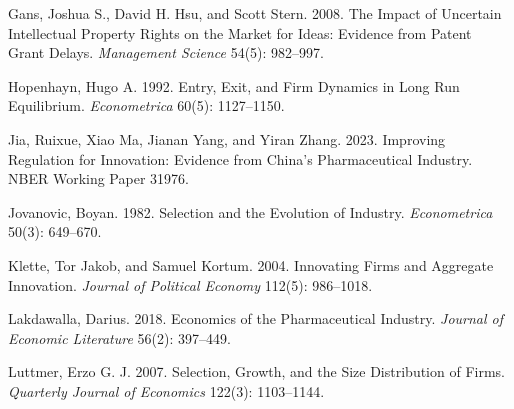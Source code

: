 \documentclass[12pt]{article}
\newcommand{\1}{\mathbf{1}}
\begin{document}
\begin{thebibliography}{}
Gans, Joshua S., David H. Hsu, and Scott Stern. 2008.
\newblock The Impact of Uncertain Intellectual Property Rights on the Market for Ideas: Evidence from Patent Grant Delays.
\newblock \emph{Management Science} 54(5): 982--997.

Hopenhayn, Hugo A. 1992.
\newblock Entry, Exit, and Firm Dynamics in Long Run Equilibrium.
\newblock \emph{Econometrica} 60(5): 1127--1150.

Jia, Ruixue, Xiao Ma, Jianan Yang, and Yiran Zhang. 2023.
\newblock Improving Regulation for Innovation: Evidence from China's Pharmaceutical Industry.
\newblock NBER Working Paper 31976.

Jovanovic, Boyan. 1982.
\newblock Selection and the Evolution of Industry.
\newblock \emph{Econometrica} 50(3): 649--670.

Klette, Tor Jakob, and Samuel Kortum. 2004.
\newblock Innovating Firms and Aggregate Innovation.
\newblock \emph{Journal of Political Economy} 112(5): 986--1018.

Lakdawalla, Darius. 2018.
\newblock Economics of the Pharmaceutical Industry.
\newblock \emph{Journal of Economic Literature} 56(2): 397--449.

Luttmer, Erzo G. J. 2007.
\newblock Selection, Growth, and the Size Distribution of Firms.
\newblock \emph{Quarterly Journal of Economics} 122(3): 1103--1144.

\end{thebibliography}
\end{document}
